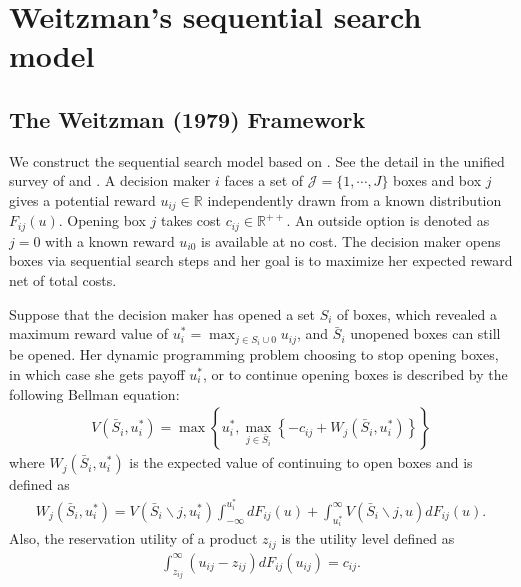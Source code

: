 \documentclass[12pt]{article}
\begin{document}
\section{Weitzman's sequential search model}

\subsection{The Weitzman (1979) Framework}
We construct the sequential search model based on \cite{weitzman1979optimal}.
See the detail in the unified survey of \cite{ursu2023sequential} and \cite{honka2019empirical}. 
A decision maker $i$ faces a set of $\mathcal{J}=\{1,\cdots,J\}$ boxes and box $j$ gives a potential reward $u_{ij}\in \mathbb{R}$ independently drawn from a known
distribution $F_{ij}(u)$.
Opening box $j$ takes cost $c_{ij}\in \mathbb{R}^{++}$. 
An outside option is denoted as $j = 0$ with a known reward $u_{i0}$ is available at no cost.
The decision maker
opens boxes via sequential search steps and her goal is to maximize her expected reward net of total costs.

Suppose that the decision maker has opened a set \(S_{i}\) of boxes,
which revealed a maximum reward value of \(u_{i}^{*}=\max _{j \in S_{i} \cup 0} u_{i j}\), and \(\bar{S}_{i}\) unopened boxes can still be
opened. 
Her dynamic programming problem choosing to stop opening boxes, in which case she
gets payoff \(u_{i}^{*}\), or to continue opening boxes is described
by the following Bellman equation:
\begin{align}
    V\left(\bar{S}_{i}, u_{i}^{*}\right)=\max \left\{u_{i}^{*}, \max _{j \in \bar{S}_{i}}\left\{-c_{i j}+W_{j}\left(\bar{S}_{i}, u_{i}^{*}\right)\right\}\right\}
\end{align}
where \(W_{j}\left(\bar{S}_{i}, u_{i}^{*}\right)\) is the expected value of continuing to open boxes and is
defined as
\begin{align}
    W_{j}\left(\bar{S}_{i}, u_{i}^{*}\right)=V\left(\bar{S}_{i} \backslash j, u_{i}^{*}\right) \int_{-\infty}^{u_{i}^{*}} d F_{i j}(u)+\int_{u_{i}^{*}}^{\infty} V\left(\bar{S}_{i} \backslash j, u\right) d F_{i j}(u).
\end{align}
Also, the reservation utility of a product \(z_{i j}\) is the utility level defined as 
\begin{align}
    \int_{z_{i j}}^{\infty}\left(u_{i j}-z_{i j}\right) d F_{i j}\left(u_{i j}\right)=c_{i j}.
\end{align}
\end{document}
